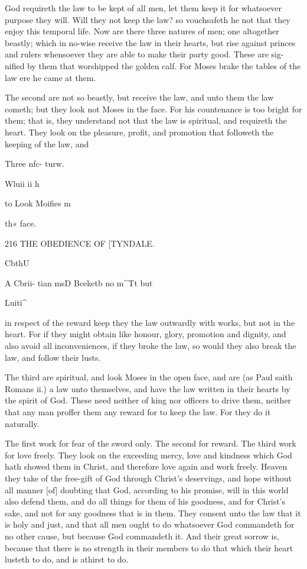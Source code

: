 \documentclass{custom}
\begin{document}
God requireth the law to be kept of all men, let them
keep it for whatsoever purpose they will. Will they not 
keep the law? so vouchsafeth he not that they enjoy this
temporal life. Now are there three natures of men; one 
altogether beastly; which in no-wise receive the law in 
their hearts, but rise against princes and rulers whensoever 
they are able to make their party good. These are sig- 
nified by them that worshipped the golden calf. For 
Moses brake the tables of the law ere he came at 
them.

The second are not so beastly, but receive the law, and 
unto them the law cometh; but they look not Moses in 
the face. For his countenance is too bright for them;
that is, they understand not that the law is spiritual, and 
requireth the heart. They look on the pleasure, profit, 
and promotion that followeth the keeping of the law, and 

Three nfc- 
turw. 

Wluii ii h 

to Look 
Moifies m 

th« face. 


216 
THE OBEDIENCE OF 
[TYNDALE. 

CbthU 

A Cbrii- 
tian msD 
Bceketb no 
m^Tt but 

Luiti^ 

in respect of the reward keep they the law outwardly with 
works, but not in the heart. For if they might obtain 
like honour, glory, promotion and dignity, and also avoid 
all inconveniences, if they broke the law, so would they 
also break the law, and follow their lusts. 

The third are spiritual, and look Moses in the open face,
and are (as Paul saith Romans ii.) a law unto themselves,
and have the law written in their hearts by the spirit of 
God. These need neither of king nor officers to drive 
them, neither that any man proffer them any reward for 
to keep the law. For they do it naturally.

The first work for fear of the sword only. The second 
for reward. The third work for love freely. They look 
on the exceeding mercy, love and kindness which God 
hath showed them in Christ, and therefore love again and 
work freely. Heaven they take of the free-gift of God 
through Christ's deservings, and hope without all manner 
[of] doubting that God, according to his promise, will in this 
world also defend them, and do all things for them of his 
goodness, and for Christ's sake, and not for any goodness 
that is in them. They consent unto the law that it is 
holy and just, and that all men ought to do whatsoever 
God commandeth for no other cause, but because God 
commandeth it. And their great sorrow is, because that 
there is no strength in their members to do that which 
their heart lusteth to do, and is athirst to do. 
\end{document}
